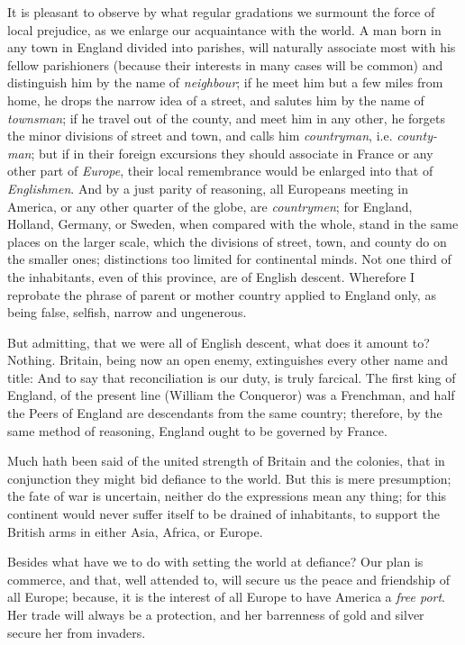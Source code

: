 \documentclass[12pt, twocolumn]{book}
\begin{document}
    It is pleasant to observe by what regular gradations we surmount the force of local prejudice, as we enlarge our acquaintance with the world. A man born in any town in England divided into parishes, will naturally associate most with his fellow parishioners (because their interests in many cases will be common) and distinguish him by the name of \textit{neighbour}; if he meet him but a few miles from home, he drops the narrow idea of a street, and salutes him by the name of \textit{townsman}; if he travel out of the county, and meet him in any other, he forgets the minor divisions of street and town, and calls him \textit{countryman}, i.e. \textit{county-man}; but if in their foreign excursions they should associate in France or any other part of \textit{Europe}, their local remembrance would be enlarged into that of \textit{Englishmen}. And by a just parity of reasoning, all Europeans meeting in America, or any other quarter of the globe, are \textit{countrymen}; for England, Holland, Germany, or Sweden, when compared with the whole, stand in the same places on the larger scale, which the divisions of street, town, and county do on the smaller ones; distinctions too limited for continental minds. Not one third of the inhabitants, even of this province, are of English descent. Wherefore I reprobate the phrase of parent or mother country applied to England only, as being false, selfish, narrow and ungenerous.

    But admitting, that we were all of English descent, what does it amount to? Nothing. Britain, being now an open enemy, extinguishes every other name and title: And to say that reconciliation is our duty, is truly farcical. The first king of England, of the present line (William the Conqueror) was a Frenchman, and half the Peers of England are descendants from the same country; therefore, by the same method of reasoning, England ought to be governed by France.

    Much hath been said of the united strength of Britain and the colonies, that in conjunction they might bid defiance to the world. But this is mere presumption; the fate of war is uncertain, neither do the expressions mean any thing; for this continent would never suffer itself to be drained of inhabitants, to support the British arms in either Asia, Africa, or Europe.

    Besides what have we to do with setting the world at defiance? Our plan is commerce, and that, well attended to, will secure us the peace and friendship of all Europe; because, it is the interest of all Europe to have America a \textit{free port}. Her trade will always be a protection, and her barrenness of gold and silver secure her from invaders.
\end{document}
